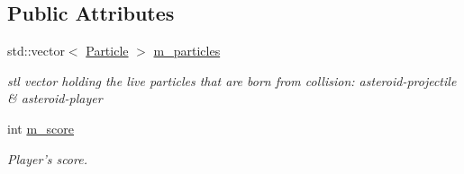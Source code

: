 \subsection*{Public Attributes}
\begin{DoxyCompactItemize}
\item 
\hypertarget{classPlayer_aaa55581c65287e0e8f7b62997b734913}{
std::vector$<$ \hyperlink{classParticle}{Particle} $>$ \hyperlink{classPlayer_aaa55581c65287e0e8f7b62997b734913}{m\_\-particles}}
\label{classPlayer_aaa55581c65287e0e8f7b62997b734913}

\begin{DoxyCompactList}\small\item\em stl vector holding the live particles that are born from collision: asteroid-\/projectile \& asteroid-\/player \item\end{DoxyCompactList}\item 
\hypertarget{classPlayer_acb96e511b658bd56e15d327d0e51b5f3}{
int \hyperlink{classPlayer_acb96e511b658bd56e15d327d0e51b5f3}{m\_\-score}}
\label{classPlayer_acb96e511b658bd56e15d327d0e51b5f3}

\begin{DoxyCompactList}\small\item\em Player's score. \item\end{DoxyCompactList}\end{DoxyCompactItemize}
